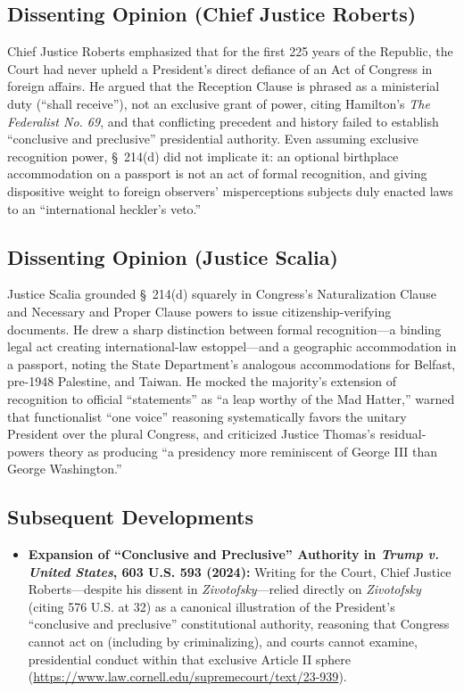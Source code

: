 \documentclass[12pt]{article}
\begin{document}
\subsection{Dissenting Opinion (Chief Justice Roberts)}

Chief Justice Roberts emphasized that for the first 225 years of the Republic, the Court had never upheld a President's direct defiance of an Act of Congress in foreign affairs. He argued that the Reception Clause is phrased as a ministerial duty (``shall receive''), not an exclusive grant of power, citing Hamilton's \textit{The Federalist No. 69}, and that conflicting precedent and history failed to establish ``conclusive and preclusive'' presidential authority. Even assuming exclusive recognition power, \S~214(d) did not implicate it: an optional birthplace accommodation on a passport is not an act of formal recognition, and giving dispositive weight to foreign observers' misperceptions subjects duly enacted laws to an ``international heckler's veto.''

\subsection{Dissenting Opinion (Justice Scalia)}

Justice Scalia grounded \S~214(d) squarely in Congress's Naturalization Clause and Necessary and Proper Clause powers to issue citizenship-verifying documents. He drew a sharp distinction between formal recognition---a binding legal act creating international-law estoppel---and a geographic accommodation in a passport, noting the State Department's analogous accommodations for Belfast, pre-1948 Palestine, and Taiwan. He mocked the majority's extension of recognition to official ``statements'' as ``a leap worthy of the Mad Hatter,'' warned that functionalist ``one voice'' reasoning systematically favors the unitary President over the plural Congress, and criticized Justice Thomas's residual-powers theory as producing ``a presidency more reminiscent of George III than George Washington.''

\subsection{Subsequent Developments}

\begin{itemize}

\item \textbf{Expansion of ``Conclusive and Preclusive'' Authority in \textit{Trump v. United States}, 603 U.S. 593 (2024):} Writing for the Court, Chief Justice Roberts---despite his dissent in \textit{Zivotofsky}---relied directly on \textit{Zivotofsky} (citing 576 U.S. at 32) as a canonical illustration of the President's ``conclusive and preclusive'' constitutional authority, reasoning that Congress cannot act on (including by criminalizing), and courts cannot examine, presidential conduct within that exclusive Article II sphere (\url{https://www.law.cornell.edu/supremecourt/text/23-939}).

\end{itemize}
\end{document}
